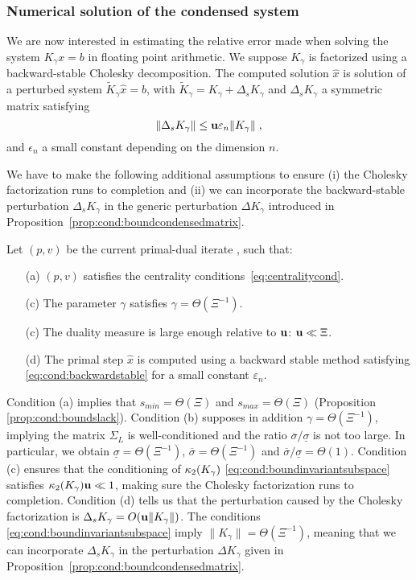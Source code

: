 \subsubsection{Numerical solution of the condensed system}
We are now interested in estimating the relative error
made when solving the system $K_\gamma x = b$ in floating
point arithmetic. We suppose $K_\gamma$ is factorized using
a backward-stable Cholesky decomposition. The computed
solution $\widehat{x}$ is solution of a perturbed system
$\widetilde{K}_\gamma \widehat{x} = b$, with $\widetilde{K}_\gamma
= K_\gamma + \Delta_s K_\gamma$ and $\Delta_s K_\gamma$ a symmetric matrix satisfying
\begin{equation}
  \label{eq:cond:backwardstable}
\|\Delta_s K_\gamma\| \leq \mathbf{u} \varepsilon_n \|K_\gamma\| \; ,
\end{equation}
and $\epsilon_n$ a small constant depending on the dimension $n$.

We have to make the following additional assumptions to
ensure (i) the Cholesky factorization runs to completion
and (ii) we can incorporate the backward-stable perturbation $\Delta_s K_\gamma$
in the generic perturbation $\Delta K_\gamma$ introduced in
Proposition~\ref{prop:cond:boundcondensedmatrix}.
\begin{assumption} Let $(p, v)$ be the current primal-dual iterate
  , such that:
  \begin{itemize}
    \item[(a)] $(p, v)$ satisfies the centrality conditions~\eqref{eq:centralitycond}.
    \item[(c)] The parameter $\gamma$ satisfies $\gamma = \Theta(\Xi^{-1})$.
    \item[(c)] The duality measure is large enough relative to $\mathbf{u}$: $\mathbf{u} \ll \Xi$.
    \item[(d)] The primal step $\widehat{x}$ is computed using a backward
      stable method satisfying \eqref{eq:cond:backwardstable} for a small constant
      $\varepsilon_n$.
  \end{itemize}
  \label{hyp:cond:wellcond}
\end{assumption}
Condition (a) implies that
$s_{min} = \Theta(\Xi)$ and $s_{max} = \Theta(\Xi)$ (Proposition \ref{prop:cond:boundslack}).
Condition (b) supposes in addition $\gamma = \Theta(\Xi^{-1})$, implying
the matrix $\Sigma_L$ is well-conditioned and
the ratio $\overline{\sigma}/\underline{\sigma}$ is not too large.
In particular, we obtain $\underline{\sigma} = \Theta(\Xi^{-1})$,
$\overline{\sigma} = \Theta(\Xi^{-1})$ and $\overline{\sigma}/\underline{\sigma} = \Theta(1)$.
Condition (c) ensures that the conditioning of $\kappa_2(K_\gamma)$
\eqref{eq:cond:boundinvariantsubspace} satisfies $\kappa_2(K_\gamma) \mathbf{u} \ll 1$,
making sure the Cholesky factorization runs to completion.
Condition (d) tells us that the perturbation caused by the Cholesky
factorization is $\Delta_s K_\gamma = O(\mathbf{u} \| K_\gamma\|)$. The
conditions \eqref{eq:cond:boundinvariantsubspace} imply $\|K_\gamma \| = \Theta(\Xi^{-1})$,
meaning that we can incorporate $\Delta_s K_\gamma$ in the perturbation
$\Delta K_\gamma$ given in Proposition~\ref{prop:cond:boundcondensedmatrix}.

